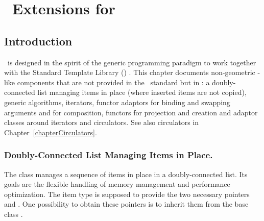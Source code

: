 
\chapter{\stl\ Extensions for \cgal}
\label{chapterDataStructures}\label{chapterStlExtensions}



\section*{Introduction}

\cgal\ is designed in the spirit of the generic programming paradigm
to work together with the Standard Template Library (\stl)
\cite{ansi-is14882,a-gps-98}. This chapter documents non-geometric
\stl-like components that are not provided in the \stl\ standard but
in \cgal: a doubly-connected list managing items in place (where
inserted items are not copied), generic algorithms, iterators, functor
adaptors for binding and swapping arguments and for composition,
functors for projection and creation and adaptor classes around
iterators and circulators. See also circulators in
Chapter~\ref{chapterCirculators}.

\subsection*{Doubly-Connected List Managing Items in Place.}

The class  manages a
sequence of items in place in a doubly-connected list. Its goals are
the flexible handling of memory management and performance
optimization. The item type is supposed to provide the two necessary
pointers  and . One possibility
to obtain these pointers is to inherit them from the base class
.

